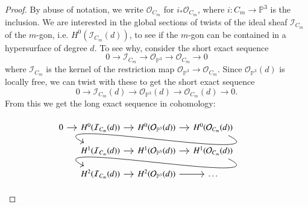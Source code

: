 \begin{proof}
    By abuse of notation, we write $\mathcal{O}_{C_m}$ for $i_* \mathcal{O}_{C_m}$, where $i: C_m \to \mathbb{P}^3$ is the inclusion. We are interested in the global sections of twists of the ideal sheaf $\mathcal{I}_{C_m}$ of the $m$-gon, i.e. $H^0(\mathcal{I}_{C_m}(d))$, to see if the $m$-gon can be contained in a hypersurface of degree $d$. To see why, consider the short exact sequence
    \[0 \to \mathcal{I}_{C_m} \to \mathcal{O}_{\mathbb{P}^3}\to \mathcal{O}_{C_m} \to 0\]
    where $\mathcal{I}_{C_m}$ is the kernel of the restriction map $\mathcal{O}_{\mathbb{P}^3} \to \mathcal{O}_{C_m}$. Since $\mathcal{O}_{\mathbb{P}^3}(d)$ is locally free, we can twist with these to get the short exact sequence
    \[0 \to \mathcal{I}_{C_m}(d) \to \mathcal{O}_{\mathbb{P}^3}(d) \to \mathcal{O}_{C_m}(d) \to 0.\]
    From this we get the long exact sequence in cohomology:
    \[
        \begin{tikzcd}[sep=small]
        0 \ar[r]
        & H^0(\mathcal{I}_{C_m}(d)) \ar[r]
        & H^0(\mathcal{O}_{\mathbb{P}^3}(d)) \ar[r]
        & H^0(\mathcal{O}_{C_m}(d)) \ar[controls={+(3,-1.5) and +(-3,1.5)}]{dll} \\
        {}
        & H^1(\mathcal{I}_{C_m}(d)) \ar[r]
        & H^1(\mathcal{O}_{\mathbb{P}^3}(d)) \ar[r]
        & H^1(\mathcal{O}_{C_m}(d)) \ar[controls={+(3,-1.5) and +(-3,1.5)}]{dll} \\
        {}
        & H^2(\mathcal{I}_{C_m}(d)) \ar[r]
        & H^2(\mathcal{O}_{\mathbb{P}^3}(d)) \ar[r]
        & \dots
        \end{tikzcd}
    \]





\end{proof}
